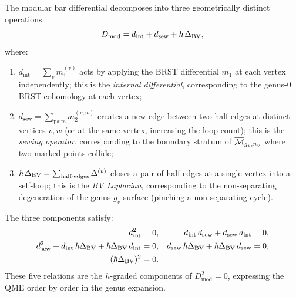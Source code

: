\begin{corollary}
\label{cor:thqg-bv-ext-three-components}
The modular bar differential decomposes into three geometrically
distinct operations:
\begin{equation}
D_{\mathrm{mod}} = d_{\mathrm{int}} + d_{\mathrm{sew}}
+ \hbar\,\Delta_{\mathrm{BV}},
\end{equation}
where:
\begin{enumerate}[label=(\roman*)]
\item $d_{\mathrm{int}} = \sum_{v} m_1^{(v)}$ acts by
 applying the BRST differential $m_1$ at each vertex
 independently; this is the \emph{internal differential},
 corresponding to the genus-$0$ BRST cohomology at each
 vertex;
\item $d_{\mathrm{sew}} = \sum_{\text{pairs}} m_2^{(v,w)}$
 creates a new edge between two half-edges at distinct
 vertices $v, w$ (or at the same vertex, increasing the
 loop count); this is the \emph{sewing operator},
 corresponding to the boundary stratum of
 $\overline{\mathcal{M}}_{g_v, n_v}$ where two marked points collide;
\item $\hbar\,\Delta_{\mathrm{BV}} = \sum_{\text{half-edges}}
 \Delta^{(v)}$ closes a pair of half-edges at a single
 vertex into a self-loop; this is the \emph{BV Laplacian},
 corresponding to the non-separating degeneration of the
 genus-$g_v$ surface (pinching a non-separating cycle).
\end{enumerate}
The three components satisfy:
\begin{align}
d_{\mathrm{int}}^2 &= 0,
&
d_{\mathrm{int}}\,d_{\mathrm{sew}}
+ d_{\mathrm{sew}}\,d_{\mathrm{int}} &= 0,\\
d_{\mathrm{sew}}^2
+ d_{\mathrm{int}}\,\hbar\Delta_{\mathrm{BV}}
+ \hbar\Delta_{\mathrm{BV}}\,d_{\mathrm{int}} &= 0,
&
d_{\mathrm{sew}}\,\hbar\Delta_{\mathrm{BV}}
+ \hbar\Delta_{\mathrm{BV}}\,d_{\mathrm{sew}} &= 0,\\
(\hbar\Delta_{\mathrm{BV}})^2 &= 0.
& &
\end{align}
These five relations are the $\hbar$-graded components of
$D_{\mathrm{mod}}^2 = 0$, expressing the QME order by order in
the genus expansion.
\end{corollary}


